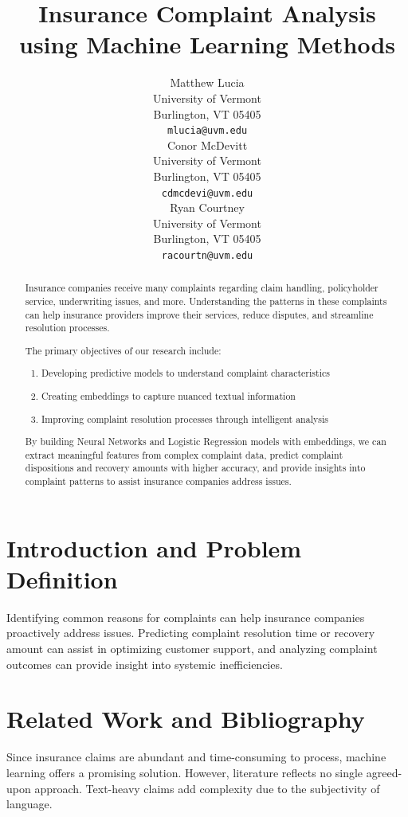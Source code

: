\documentclass[final]{article}
\title{Insurance Complaint Analysis using Machine Learning Methods}
\author{%
  Matthew Lucia \\
  University of Vermont\\
  Burlington, VT 05405 \\
  \texttt{mlucia@uvm.edu} \\
  \And
  Conor McDevitt \\
  University of Vermont \\
  Burlington, VT 05405 \\
  \texttt{cdmcdevi@uvm.edu} \\
  \And
  Ryan Courtney \\
  University of Vermont \\
  Burlington, VT 05405 \\
  \texttt{racourtn@uvm.edu} \\
}
\begin{document}
\maketitle

\begin{abstract}
Insurance companies receive many complaints regarding claim handling, policyholder service, underwriting issues, and more. Understanding the patterns in these complaints can help insurance providers improve their services, reduce disputes, and streamline resolution processes.

The primary objectives of our research include:
\begin{enumerate}
  \item Developing predictive models to understand complaint characteristics
  \item Creating embeddings to capture nuanced textual information
  \item Improving complaint resolution processes through intelligent analysis
\end{enumerate}
By building Neural Networks and Logistic Regression models with embeddings, we can extract meaningful features from complex complaint data, predict complaint dispositions and recovery amounts with higher accuracy, and provide insights into complaint patterns to assist insurance companies address issues.
\end{abstract}

\section{Introduction and Problem Definition}

Identifying common reasons for complaints can help insurance companies proactively address issues. Predicting complaint resolution time or recovery amount can assist in optimizing customer support, and analyzing complaint outcomes can provide insight into systemic inefficiencies.

\section{Related Work and Bibliography}

Since insurance claims are abundant and time-consuming to process, machine learning offers a promising solution. However, literature reflects no single agreed-upon approach. Text-heavy claims add complexity due to the subjectivity of language.
\end{document}
